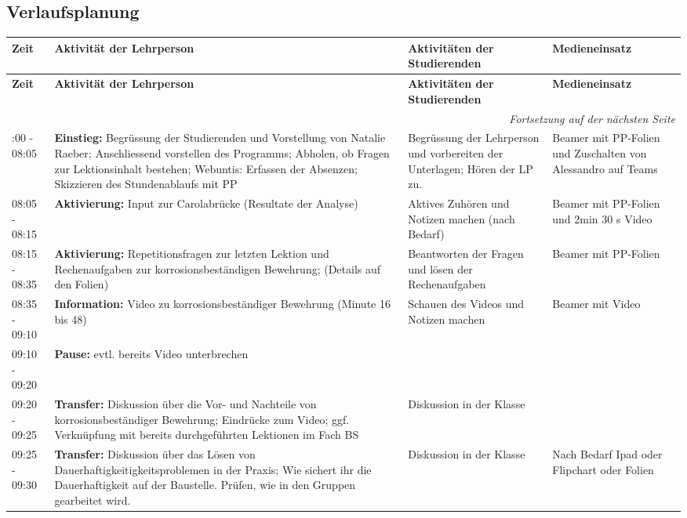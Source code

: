 \documentclass[
11pt,
captions=tableheading,
headsepline,
footsepline, 
captions=tableheading,
parskip=half-,
]{scrartcl}
\begin{document}
\begin{landscape}
\subsection{Verlaufsplanung}
\begin{longtable}{@{}l|p{9cm}p{7.5cm}p{3.5cm}@{}}
    \toprule
    \textbf{Zeit} & \textbf{Aktivität der Lehrperson} & \textbf{Aktivitäten der Studierenden} & \textbf{Medieneinsatz} \\
    \midrule
    \endfirsthead
    \toprule
    \textbf{Zeit} & \textbf{Aktivität der Lehrperson} & \textbf{Aktivitäten der Studierenden} & \textbf{Medieneinsatz} \\
    \midrule
    \endhead
    \midrule
    \multicolumn{4}{r}{\textit{Fortsetzung auf der nächsten Seite}} \\
    \midrule
    \endfoot
    \bottomrule
    \endlastfoot
    \midrule
    08:00 - 08:05 & \textbf{Einstieg: }Begrüssung der Studierenden und Vorstellung von Natalie Raeber; Anschliessend vorstellen des Programms; Abholen, ob Fragen zur Lektionsinhalt bestehen; Webuntis: Erfassen der Absenzen; Skizzieren des Stundenablaufs mit PP & Begrüssung der Lehrperson und vorbereiten der Unterlagen; Hören der LP zu. & Beamer mit PP-Folien und Zuschalten von Alessandro auf Teams\\
    \midrule
    08:05 - 08:15 & \textbf{Aktivierung: } Input zur Carolabrücke (Resultate der Analyse) & Aktives Zuhören und Notizen machen (nach Bedarf) & Beamer mit PP-Folien und 2min 30 s Video\\
    \midrule
    08:15 - 08:35 & \textbf{Aktivierung:} Repetitionsfragen zur letzten Lektion und Rechenaufgaben zur korrosionsbeständigen Bewehrung; (Details auf den Folien) & Beantworten der Fragen und lösen der Rechenaufgaben  & Beamer mit PP-Folien\\
    \midrule
    08:35 - 09:10 & \textbf{Information:} Video zu korrosionsbeständiger Bewehrung (Minute 16 bis 48) & Schauen des Videos und Notizen machen & Beamer mit Video\\
    \midrule
    09:10 - 09:20 & \textbf{Pause:} evtl. bereits Video unterbrechen {} & {}\\
    \midrule
    09:20 - 09:25 & \textbf{Transfer:} Diskussion über die Vor- und Nachteile von korrosionsbeständiger Bewehrung; Eindrücke zum Video; ggf. Verknüpfung mit bereits durchgeführten Lektionen im Fach BS & Diskussion in der Klasse & {}\\
    \midrule
    09:25 - 09:30 & \textbf{Transfer:} Diskussion über das Lösen von Dauerhaftigkeitigkeitsproblemen in der Praxis; Wie sichert ihr die Dauerhaftigkeit auf der Baustelle. Prüfen, wie in den Gruppen gearbeitet wird. & Diskussion in der Klasse & Nach Bedarf Ipad oder Flipchart oder Folien \\

\end{longtable}
\end{landscape}
\end{document}
